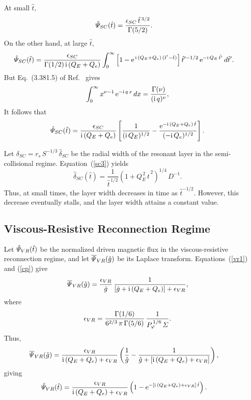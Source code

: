 \documentclass[12pt,prb,aps]{revtex4-1}
\begin{document}
At small $\hat{t}$, 
\begin{align}\label{scs}
\hat{\mit\Psi}_{SC}(\hat{t}) &= \frac{\epsilon_{SC}\,\hat{t}^{\,3/2}}{\Gamma(5/2)}.
\end{align}
On the other hand, at large $\hat{t}$, 
\begin{align}
\hat{\mit\Psi}_{SC}(\hat{t}) &= \frac{\epsilon_{SC}}{\Gamma(1/2)\,{\rm i}\,(Q_E+Q_e)} \int
_0^{\infty}\left[1-{\rm e}^{\,{\rm i}\,(Q_E+Q_e)\,(\hat{t}'-\hat{t})}\right]
\hat{t}'^{-1/2}\,{\rm e}^{-{\rm i}\,Q_E\,\hat{t'}}\,d\hat{t}'.
\end{align}
But Eq.~(3.381.5) of Ref.~ gives
\begin{equation}
\int_0^\infty x^{\nu-1}\,{\rm e}^{-{\rm i}\,q\,x}\,dx = \frac{\Gamma(\nu)}{({\rm i}\,q)^{\nu}},
\end{equation}
It follows that
\begin{equation}\label{scl}
\hat{\mit\Psi}_{SC}(\hat{t}) = \frac{\epsilon_{SC}}{{\rm i}\,(Q_E+Q_e)}
\left[\frac{1}{({\rm i}\,Q_E)^{1/2}} - \frac{{\rm e}^{-{\rm i}\,(Q_E+Q_e)\,\hat{t}}}{(-{\rm i}\,Q_e)^{1/2}}\right].
\end{equation}

Let $\delta_{SC} =r_s\,S^{-1/3}\,\hat{\delta}_{SC}$ be the radial width of the resonant layer in the semi-collisional regime. 
Equation~(\ref{sc3}) yields
\begin{equation}
\hat{\delta}_{SC}(\hat{t}) = \frac{1}{\hat{t}^{\,1/2}}\left(1+Q_E^{\,2}\,\hat{t}^{\,2}\right)^{1/4}\,D^{-1}.
\end{equation}
Thus, at small times, the layer width decreases in time as $\hat{t}^{-1/2}$. However, this decrease eventually stalls, and the
layer width attains a constant value. 

\subsection{Viscous-Resistive Reconnection Regime}
Let $\hat{\mit\Psi}_{VR}(\hat{t})$ be the normalized driven magnetic flux in the viscous-resistive reconnection regime, and let $\overline{\mit\Psi}_{VR}(\hat{g})$ be its Laplace transform.
Equations~(\ref{vr1}) and (\ref{cp}) give
\begin{equation}
\overline{\mit\Psi}_{VR}(\hat{g}) =\frac{\epsilon_{VR}}{\hat{g}}\,\frac{1}{[\hat{g}+ {\rm i}\,(Q_E+Q_e)]+\epsilon_{VR}},
\end{equation}
where
\begin{equation}
\epsilon_{VR} = \frac{\Gamma(1/6)}{6^{2/3}\,\pi\,\Gamma(5/6)}\,\frac{1}{P_\varphi^{\,1/6}\,{\mit\Sigma}}.
\end{equation}
Thus,
\begin{align}
\overline{\mit\Psi}_{VR}(\hat{g}) &= 
\frac{\epsilon_{VR}}{{\rm i}\,(Q_E+Q_e)+\epsilon_{VR}}\left(\frac{1}{\hat{g}} - \frac{1}{\hat{g} +[ {\rm i}\,(Q_E+Q_e)+\epsilon_{VR}]}\right),
\end{align}
giving
\begin{align}\label{vrp}
\hat{\mit\Psi}_{VR}(\hat{t}) &= \frac{\epsilon_{VR}}{{\rm i}\,(Q_E+Q_e)+\epsilon_{VR}}\left(1 - {\rm e}^{- [{\rm i}\,(Q_E+Q_e)+\epsilon_{VR}]\,\hat{t}}\right).
\end{align}
\end{document}
